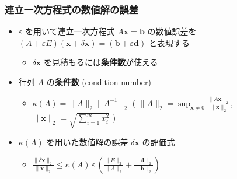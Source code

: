\documentclass[dvipdfmx,aspectratio=169,20pt]{beamer}
\newcommand{\myfontsetting}[3]{{\fontsize{#1}{#2}\selectfont #3}}
\begin{document}
\begin{frame}
\frametitle{{\large 連立一次方程式の数値解の誤差}}

\begin{itemize}
    \setlength{\itemsep}{0.2cm}
    \item \myfontsetting{15pt}{15pt}{
    $\varepsilon$ を用いて連立一次方程式 $A\bm{x}=\bm{b}$ の数値誤差を $(A+\varepsilon E)(\bm{x}+\delta \bm{x})=(\bm{b}+\varepsilon \bm{d})$ と表現する
    }
    \begin{itemize}
        \item \myfontsetting{12pt}{12pt}{
        $\delta \bm{x}$ を見積もるには{\bf 条件数}が使える
        }
    \end{itemize}
    \item \myfontsetting{15pt}{15pt}{
    行列 $A$ の{\bf 条件数} \myfontsetting{15pt}{15pt}{ (condition number)}}
    \begin{itemize}
        \vspace{2mm}
        \item \myfontsetting{15pt}{15pt}{
        $\kappa(A) = \|A\|_2\|A^{-1}\|_2$
        } \hspace{2mm} \myfontsetting{12pt}{12pt}{
          (\myfontsetting{10pt}{10pt}{ $\displaystyle\|A\|_2 = \sup_{\bm{x}\neq 0}\frac{\|A\bm{x}\|_2}{\|\bm{x}\|_2}$, $\|\bm{x}\|_2 = \sqrt{\sum_{i=1}^m x_i^2}$
            } )}
     \end{itemize}
     \item \myfontsetting{15pt}{15pt}{
     $\kappa(A)$ を用いた数値解の誤差 $\delta\bm{x}$ の評価式
     }
     \begin{itemize}
         \item 
         \myfontsetting{12pt}{12pt}{
         $\displaystyle
             \frac{\| \delta \bm{x} \|_2}{\|\bm{x}\|_2} \le \kappa(A)\, \varepsilon\, \left( \frac{\|E\|_2}{\|A\|_2} +  \frac{\|\bm{d}\|_2}{\|\bm{b}\|_2} \right)$
         }
     \end{itemize}
 \end{itemize}
\end{frame}
\end{document}

